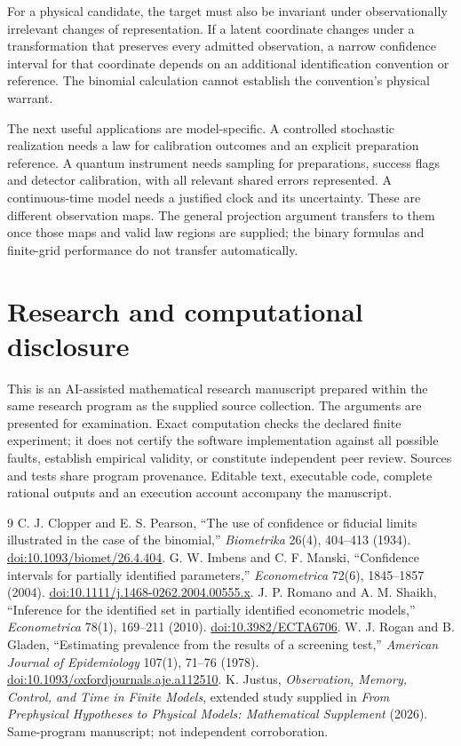 \documentclass[11pt,a4paper]{article}
\theoremstyle{definition}\newtheorem{definition}[theorem]{Definition}
\begin{document}
For a physical candidate, the target must also be invariant under observationally irrelevant changes of representation. If a latent coordinate changes under a transformation that preserves every admitted observation, a narrow confidence interval for that coordinate depends on an additional identification convention or reference. The binomial calculation cannot establish the convention's physical warrant.

The next useful applications are model-specific. A controlled stochastic realization needs a law for calibration outcomes and an explicit preparation reference. A quantum instrument needs sampling for preparations, success flags and detector calibration, with all relevant shared errors represented. A continuous-time model needs a justified clock and its uncertainty. These are different observation maps. The general projection argument transfers to them once those maps and valid law regions are supplied; the binary formulas and finite-grid performance do not transfer automatically.

\section*{Research and computational disclosure}
This is an AI-assisted mathematical research manuscript prepared within the same research program as the supplied source collection. The arguments are presented for examination. Exact computation checks the declared finite experiment; it does not certify the software implementation against all possible faults, establish empirical validity, or constitute independent peer review. Sources and tests share program provenance. Editable text, executable code, complete rational outputs and an execution account accompany the manuscript.

\begin{thebibliography}{9}
 C. J. Clopper and E. S. Pearson, “The use of confidence or fiducial limits illustrated in the case of the binomial,” \emph{Biometrika} 26(4), 404–413 (1934). \href{https://doi.org/10.1093/biomet/26.4.404}{doi:10.1093/biomet/26.4.404}.
 G. W. Imbens and C. F. Manski, “Confidence intervals for partially identified parameters,” \emph{Econometrica} 72(6), 1845–1857 (2004). \href{https://doi.org/10.1111/j.1468-0262.2004.00555.x}{doi:10.1111/j.1468-0262.2004.00555.x}.
 J. P. Romano and A. M. Shaikh, “Inference for the identified set in partially identified econometric models,” \emph{Econometrica} 78(1), 169–211 (2010). \href{https://doi.org/10.3982/ECTA6706}{doi:10.3982/ECTA6706}.
 W. J. Rogan and B. Gladen, “Estimating prevalence from the results of a screening test,” \emph{American Journal of Epidemiology} 107(1), 71–76 (1978). \href{https://doi.org/10.1093/oxfordjournals.aje.a112510}{doi:10.1093/oxfordjournals.aje.a112510}.
 K. Justus, \emph{Observation, Memory, Control, and Time in Finite Models}, extended study supplied in \emph{From Prephysical Hypotheses to Physical Models: Mathematical Supplement} (2026). Same-program manuscript; not independent corroboration.
\end{thebibliography}
\clearpage
\appendix
\end{document}
